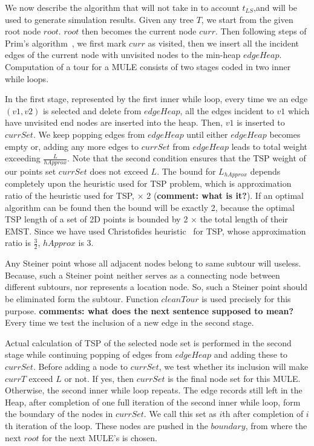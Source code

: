 We now describe the algorithm that will not take in to account $t_{LS}$,and will be used to generate simulation results. Given any tree $T$, we start from the given root node $root$. $root$ then becomes the current node $curr$. Then following steps of Prim's algorithm~\cite{Prim}, we first mark $curr$ as visited, then we insert all the incident edges of the current node with unvisited nodes to the min-heap $edgeHeap$. Computation of a tour for a MULE consists of two stages coded in two inner while loops.

In the first stage, represented by the first inner while loop, every time we an edge $(v1,v2)$ is selected and delete from $edgeHeap$, all the edges incident to $v1$ which have unvisited end nodes are inserted into the heap. Then, $v1$ is inserted to $currSet$. We keep popping edges from $edgeHeap$ until either $edgeHeap$ becomes empty or, adding any more edges to $currSet$ from $edgeHeap$ leads to total weight exceeding $\frac{L}{hApprox}$. Note that the second condition ensures that the TSP weight of our points set $currSet$ does not exceed $L$. The bound for $L_{hApprox}$ depends completely upon the heuristic used for TSP problem, which is approximation ratio of the heuristic used for TSP, $\times$ 2 ({\bf comment: what is it?}). If an optimal algorithm can be found then the bound will be exactly 2, because the optimal TSP length of  a set of 2D points is bounded by 2 $\times$ the total length of their EMST. Since we have used Christofides heuristic~\cite{christofides} for TSP, whose approximation ratio is $\frac{3}{2}$, $hApprox$ is 3.

Any Steiner point whose all adjacent nodes belong to same subtour will useless. Because, such a Steiner point neither serves as a connecting node between different subtours, nor represents a location node. So, such a Steiner point should be eliminated form the subtour. Function $cleanTour$ is used precisely for this purpose. {\bf comments: what does the next sentence supposed to mean?} Every time we test the inclusion of a new edge in the second stage.

Actual calculation of TSP of the selected node set is performed in the second stage while  %
continuing popping of edges from $edgeHeap$ and adding these to $currSet$. Before adding a node to $currSet$, we test whether its inclusion will make $currT$ exceed $L$ or not. If yes, then $currSet$ is the final node set for this MULE. Otherwise, the second inner while loop repeats. %
The edge records still left in the Heap, after completion of one full iteration of the second inner while loop, form the boundary of the nodes in $currSet$. We call this set as $i$th after completion of $i$th iteration of the loop. %
These nodes are pushed in the $boundary$, from where the next $root$ for the next MULE's is chosen.%


